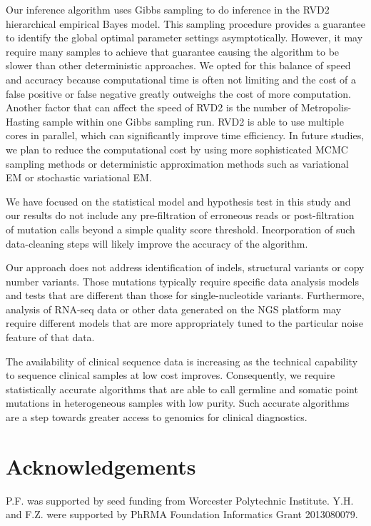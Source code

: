 \documentclass{bioinfo}
\begin{document}
Our inference algorithm uses Gibbs sampling to do inference in the RVD2 hierarchical empirical Bayes model. 
This sampling procedure provides a guarantee to identify the global optimal parameter settings asymptotically. 
However, it may require many samples to achieve that guarantee causing the algorithm to be slower than other deterministic approaches. We opted for this balance of speed and accuracy because computational time is often not limiting and the cost of a false positive or false negative greatly outweighs the cost of more computation. 
Another factor that can affect the speed of RVD2 is the number of Metropolis-Hasting sample within one Gibbs sampling run. 
RVD2 is able to use multiple cores in parallel, which can significantly improve time efficiency. 
In future studies, we plan to reduce the computational cost by using more sophisticated MCMC sampling methods or deterministic approximation methods such as variational EM or stochastic variational EM.

We have focused on the statistical model and hypothesis test in this study and our results do not include any pre-filtration of erroneous reads or post-filtration of mutation calls beyond a simple quality score threshold. 
Incorporation of such data-cleaning steps will likely improve the accuracy of the algorithm.

Our approach does not address identification of indels, structural variants or copy number variants. 
Those mutations typically require specific data analysis models and tests that are different than those for single-nucleotide variants. 
Furthermore, analysis of RNA-seq data or other data generated on the NGS platform may require different models that are more appropriately tuned to the particular noise feature of that data.

The availability of clinical sequence data is increasing as the technical capability to sequence clinical samples at low cost improves. 
Consequently, we require statistically accurate algorithms that are able to call germline and somatic point mutations in heterogeneous samples with low purity. 
Such accurate algorithms are a step towards greater access to genomics for clinical diagnostics.

\vspace{-5pt}
\section*{Acknowledgements}
P.F. was supported by seed funding from Worcester Polytechnic Institute. Y.H. and F.Z. were supported by PhRMA Foundation Informatics Grant 2013080079.



\end{document}
